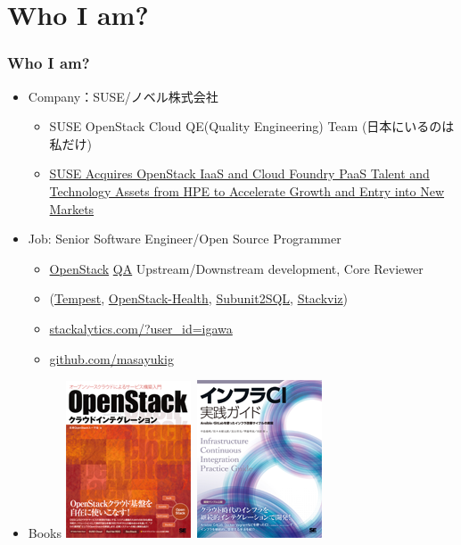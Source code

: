 \documentclass[aspectratio=169,11pt,hyperref={colorlinks=true}]{beamer}
\begin{document}
\section{Who I am?}
\begin{frame}
  \frametitle{Who I am?}
  \begin{itemize}
    \item Company：SUSE/ノベル株式会社
      \begin{itemize}
        \item SUSE OpenStack Cloud QE(Quality Engineering) Team (日本にいるのは私だけ)
        \item[] \href{https://www.suse.com/newsroom/post/2016/suse-acquires-openstack-iaas-and-cloud-foundry-paas-talent-and-technology-assets-from-hpe-to-accelerate-growth-and-entry-into-new-markets/}{SUSE Acquires OpenStack IaaS and Cloud Foundry PaaS Talent and Technology Assets from HPE to Accelerate Growth and Entry into New Markets}
      \end{itemize}
    \item Job: Senior Software Engineer/Open Source Programmer
      \begin{itemize}
        \item \href{https://www.openstack.org/}{OpenStack}
         \href{https://wiki.openstack.org/wiki/QA}{QA} Upstream/Downstream development, Core Reviewer
        \item[] (\href{https://docs.openstack.org/developer/tempest/}{Tempest},
         \href{http://status.openstack.org/openstack-health/}{OpenStack-Health},
         \href{https://docs.openstack.org/developer/subunit2sql/}{Subunit2SQL},
         \href{https://docs.openstack.org/developer/stackviz/}{Stackviz})
        \item \href{http://stackalytics.com/?user_id=igawa&release=all&metric=all}{stackalytics.com/?user\_id=igawa}
        \item \href{https://github.com/masayukig}{github.com/masayukig}
      \end{itemize}
    \item Books \includegraphics[scale=0.2]{OpenStack_Integration_book.png}~\includegraphics[scale=0.2]{InfraCI_book.png}

\end{itemize}
\end{frame}
\end{document}
